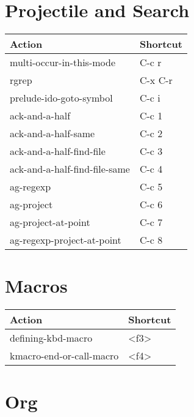 \documentclass[english]{rcalibritwocolumn}
\begin{document}
\section{Projectile and Search}
\label{sec-5}


\begin{center}
\begin{tabular}{ll}
 \textbf{Action}                &  \textbf{Shortcut}  \\
\hline
 multi-occur-in-this-mode       &  C-c r              \\
 rgrep                          &  C-x C-r            \\
 prelude-ido-goto-symbol        &  C-c i              \\
\hline
 ack-and-a-half                 &  C-c 1              \\
 ack-and-a-half-same            &  C-c 2              \\
 ack-and-a-half-find-file       &  C-c 3              \\
 ack-and-a-half-find-file-same  &  C-c 4              \\
\hline
 ag-regexp                      &  C-c 5              \\
 ag-project                     &  C-c 6              \\
 ag-project-at-point            &  C-c 7              \\
 ag-regexp-project-at-point     &  C-c 8              \\
\end{tabular}
\end{center}
\section{Macros}
\label{sec-6}


\begin{center}
\begin{tabular}{ll}
 \textbf{Action}           &  \textbf{Shortcut}  \\
\hline
 defining-kbd-macro        &  <f3>               \\
 kmacro-end-or-call-macro  &  <f4>               \\
\end{tabular}
\end{center}
\section{Org}
\label{sec-7}
\end{document}
